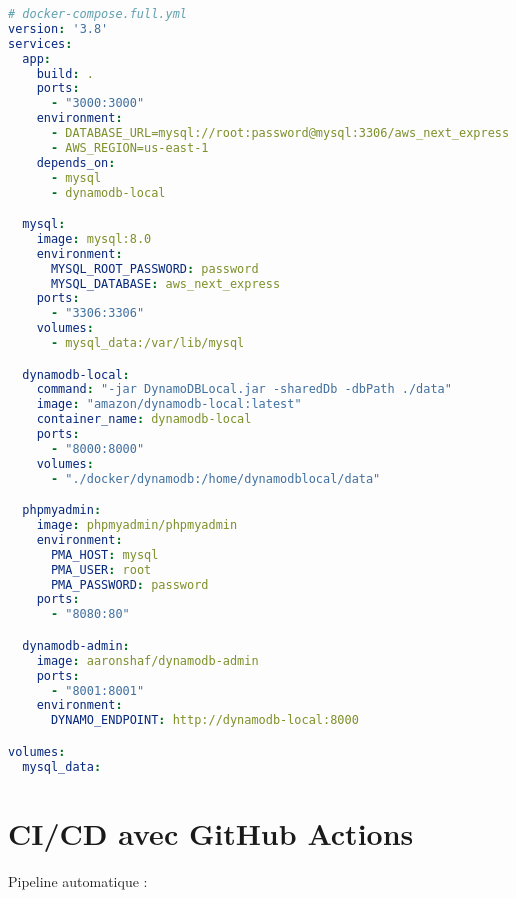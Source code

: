 \documentclass[12pt,a4paper]{report}
\begin{document}
\begin{lstlisting}[language=yaml, caption=Docker Compose complet]
# docker-compose.full.yml
version: '3.8'
services:
  app:
    build: .
    ports:
      - "3000:3000"
    environment:
      - DATABASE_URL=mysql://root:password@mysql:3306/aws_next_express
      - AWS_REGION=us-east-1
    depends_on:
      - mysql
      - dynamodb-local

  mysql:
    image: mysql:8.0
    environment:
      MYSQL_ROOT_PASSWORD: password
      MYSQL_DATABASE: aws_next_express
    ports:
      - "3306:3306"
    volumes:
      - mysql_data:/var/lib/mysql

  dynamodb-local:
    command: "-jar DynamoDBLocal.jar -sharedDb -dbPath ./data"
    image: "amazon/dynamodb-local:latest"
    container_name: dynamodb-local
    ports:
      - "8000:8000"
    volumes:
      - "./docker/dynamodb:/home/dynamodblocal/data"

  phpmyadmin:
    image: phpmyadmin/phpmyadmin
    environment:
      PMA_HOST: mysql
      PMA_USER: root
      PMA_PASSWORD: password
    ports:
      - "8080:80"

  dynamodb-admin:
    image: aaronshaf/dynamodb-admin
    ports:
      - "8001:8001"
    environment:
      DYNAMO_ENDPOINT: http://dynamodb-local:8000

volumes:
  mysql_data:
\end{lstlisting}

\section{CI/CD avec GitHub Actions}

Pipeline automatique :
\end{document}

